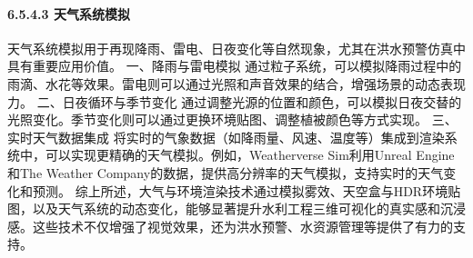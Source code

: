 {{{{{{{{{{\paragraph{6.5.4.3 天气系统模拟}\label{ux5929ux6c14ux7cfbux7edfux6a21ux62df} 天气系统模拟用于再现降雨、雷电、日夜变化等自然现象，尤其在洪水预警仿真中具有重要应用价值。
一、降雨与雷电模拟 通过粒子系统，可以模拟降雨过程中的雨滴、水花等效果。雷电则可以通过光照和声音效果的结合，增强场景的动态表现力。 二、日夜循环与季节变化
通过调整光源的位置和颜色，可以模拟日夜交替的光照变化。季节变化则可以通过更换环境贴图、调整植被颜色等方式实现。 三、实时天气数据集成
将实时的气象数据（如降雨量、风速、温度等）集成到渲染系统中，可以实现更精确的天气模拟。例如，Weatherverse Sim利用Unreal Engine和The Weather
Company的数据，提供高分辨率的天气模拟，支持实时的天气变化和预测。
综上所述，大气与环境渲染技术通过模拟雾效、天空盒与HDR环境贴图，以及天气系统的动态变化，能够显著提升水利工程三维可视化的真实感和沉浸感。这些技术不仅增强了视觉效果，还为洪水预警、水资源管理等提供了有力的支持。
}}}}}}}}}}
